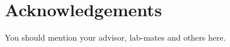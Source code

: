 \documentclass[letterpaper,12pt,openany]{report}
\begin{document}

\chapter*{\centering Acknowledgements}

You should mention your advisor, lab-mates and others here.

\tableofcontents %

\listoffigures %

\listoftables %


\end{document}
